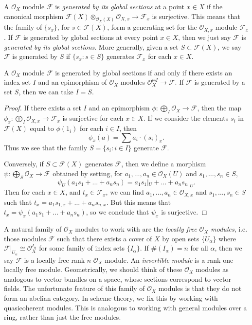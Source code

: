 A $\mathcal{O}_X$ module $\mathcal{F}$ is \emph{generated by its global sections} at a point $x \in X$ if the canonical morphism $\mathcal{F}(X) \otimes_{\mathcal{O}_X(X)} \mathcal{O}_{X,x} \to \mathcal{F}_x$ is surjective. This means that the family of $\{ s_x \}$, for $s \in \mathcal{F}(X)$, form a generating set for the $\mathcal{O}_{X,x}$ module $\mathcal{F}_x$. If $\mathcal{F}$ is generated by global sections at every point $x \in X$, then we just say $\mathcal{F}$ is \emph{generated by its global sections}. More generally, given a set $S \subset \mathcal{F}(X)$, we say $\mathcal{F}$ is generated by $S$ if $\{ s_x : s \in S \}$ generates $\mathcal{F}_x$ for each $x \in X$.

\begin{lemma}
    A $\mathcal{O}_X$ module $\mathcal{F}$ is generated by global sections if and only if there exists an index set $I$ and an epimorphism of $\mathcal{O}_X$ modules $\mathcal{O}_X^{\oplus I} \to \mathcal{F}$. If $\mathcal{F}$ is generated by a set $S$, then we can take $I = S$.
\end{lemma}
\begin{proof}
    If there exists a set $I$ and an epimorphism $\phi: \bigoplus_I \mathcal{O}_X \to \mathcal{F}$, then the map $\phi_x: \bigoplus_I \mathcal{O}_{X,x} \to \mathcal{F}_x$ is surjective for each $x \in X$. If we consider the elements $s_i$ in $\mathcal{F}(X)$ equal to $\phi(1_i)$ for each $i \in I$, then
    \[ \phi_x \left( a \right) = \sum a_i \cdot (s_i)_x. \]
    Thus we see that the family $S = \{ s_i : i \in I \}$ generate $\mathcal{F}$.

    Conversely, if $S \subset \mathcal{F}(X)$ generates $\mathcal{F}$, then we define a morphism $\psi: \bigoplus_S \mathcal{O}_X \to \mathcal{F}$ obtained by setting, for $a_1,\dots,a_n \in \mathcal{O}_X(U)$ and $s_1,\dots,s_n \in S$,
    \[ \psi_U \left( a_1 s_1 + \dots + a_n s_n \right) = a_1 s_1|_U + \dots + a_n s_n|_U. \]
    Then for each $x \in X$, and $t_x \in \mathcal{F}_x$, we can find $a_1,\dots,a_n \in \mathcal{O}_{X,x}$ and $s_1,\dots,s_n \in S$ such that $t_x = a_1 s_{1,x} + \dots + a_n s_{n,x}$. But this means that $t_x = \psi_x(a_1s_1 + \dots + a_n s_n)$, so we conclude that $\psi_x$ is surjective.
\end{proof}

A natural family of $\mathcal{O}_X$ modules to work with are the \emph{locally free $\mathcal{O}_X$ modules}, i.e. those modules $\mathcal{F}$ such that there exists a cover of $X$ by open sets $\{ U_\alpha \}$ where $\mathcal{F}|_{U_\alpha} \cong \mathcal{O}_X^{I_\alpha}$ for some family of index sets $\{ I_\alpha \}$. If $\#(I_\alpha) = n$ for all $\alpha$, then we say $\mathcal{F}$ is a locally free rank $n$ $\mathcal{O}_X$ module.  An \emph{invertible module} is a rank one locally free module. Geometrically, we should think of these $\mathcal{O}_X$ modules as analogous to vector bundles on a space, whose sections correspond to vector fields. The unfortunate feature of this family of $\mathcal{O}_X$ modules is that they do not form an abelian category. In scheme theory, we fix this by working with quasicoherent modules. This is analogous to working with general modules over a ring, rather than just the free modules.

